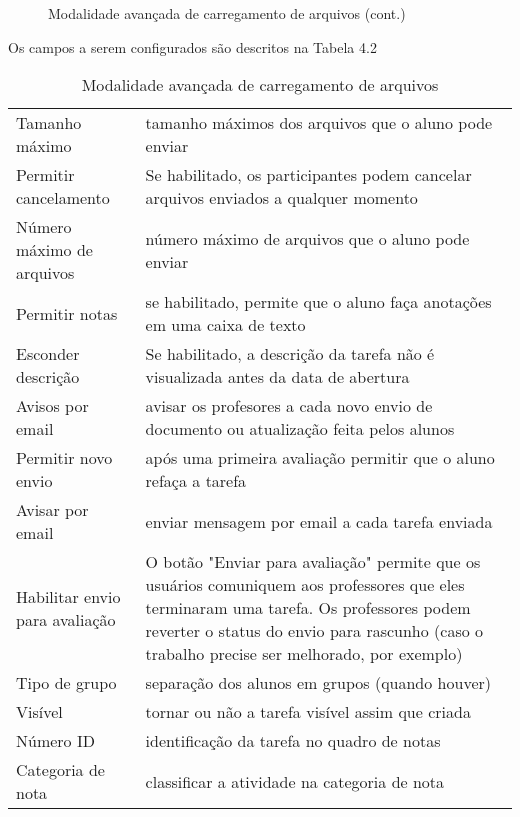 \begin{figure}
 \begin{center}
  \caption{Modalidade avançada de carregamento de arquivos (cont.)}
 \end{center}
\end{figure}

Os campos a serem configurados são descritos na Tabela 4.2

\begin{table}
 \begin{center}
  \begin{tabular}{p{4.5cm} p{9.5cm}} \\
  Tamanho máximo & tamanho máximos dos arquivos que o aluno pode enviar \\
  Permitir cancelamento & Se habilitado, os participantes podem cancelar arquivos enviados a qualquer momento \\
  Número máximo de arquivos & número máximo de arquivos que o aluno pode enviar \\
  Permitir notas & se habilitado, permite que o aluno faça anotações em uma caixa de texto \\
  Esconder descrição &  Se habilitado, a descrição da tarefa não é visualizada antes da data de abertura \\
  Avisos por email & avisar os profesores a cada novo envio de documento ou atualização feita pelos alunos \\
  Permitir novo envio & após uma primeira avaliação permitir que o aluno refaça a tarefa \\
  Avisar por email & enviar mensagem por email a cada tarefa enviada \\
  Habilitar envio para avaliação & O botão "Enviar para avaliação" permite que os usuários comuniquem aos professores que eles terminaram uma tarefa. Os professores podem reverter o status do envio para rascunho (caso o trabalho precise ser melhorado, por exemplo) \\
  Tipo de grupo & separação dos alunos em grupos (quando houver) \\
  Visível & tornar ou não a tarefa visível assim que criada \\
  Número ID & identificação da tarefa no quadro de notas \\
  Categoria de nota & classificar a atividade na categoria de nota \\ \hline
 \end{tabular}
 \caption{Modalidade avançada de carregamento de arquivos}
 \end{center}
\end{table}


